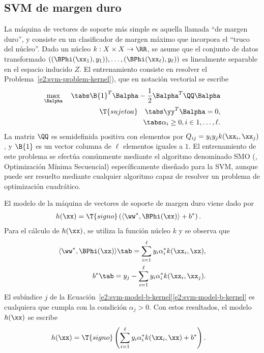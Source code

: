 %
%
\subsection{SVM de margen duro}
%
La máquina de vectores de soporte más simple es aquella llamada ``de
margen duro'', y consiste en un clasificador de margen máximo que
incorpora el ``truco del núcleo''.
Dado un núcleo $k:X\times{}X\rightarrow\RR$, se asume que el conjunto
de datos transformado
$\left((\BPhi(\xx_1),y_1)),\ldots,(\BPhi(\xx_\ell),y_\ell)\right)$ es
linealmente separable en el espacio inducido $Z$.
El entrenamiento consiste en resolver el
Problema~\ref{e2:svm-problem-kernel}), que en notación vectorial se
escribe
%
\begin{equation}\label{e2:svm-hard-margin}
  \begin{aligned}
    \max_{\Balpha}\quad\tabs
      \B{1}^T\Balpha-\frac{1}{2}\Balpha^T\QQ\Balpha\\
    \T{sujeto a} \quad\tabs
      \yy^T\Balpha = 0, \\
      \tabs \alpha_i\geq 0,  i\in {1,\ldots,\ell }.
  \end{aligned}
\end{equation}
%
La matriz $\QQ$ es semidefinida positiva con elementos por
$Q_{ij}=y_iy_jk(\xx_i,\xx_j)$, y $\B{1}$ es un vector columna de
$\ell$ elementos iguales a $1$.
El entrenamiento de este problema se efectúa comúnmente mediante el
algoritmo denominado SMO (,
Optimización Mínima Secuencial) \cite{smo} específicamente diseñado
para la SVM, aunque puede ser resuelto mediante cualquier algoritmo
capaz de resolver un problema de optimización cuadrático.

El modelo de la máquina de vectores de soporte de margen
duro viene dado por
%
\begin{align}\label{e2:svm-model-hard0}
    h(\xx) &= \T{signo}\left(\langle\ww^*,\BPhi(\xx)\rangle+b^*\right).
\end{align}
%
Para el cálculo de $h(\xx)$, se utiliza la función núcleo $k$ y se
observa que
%
\begin{align}
  \langle\ww^*,\BPhi(\xx)\rangle \tab=
  \sum_{i=1}^\ell{}y_i\alpha^*_ik(\xx_i,\xx),\\
  b^* \tab= y_j - \sum_{i=1}^\ell{}y_i\alpha^*_ik(\xx_i,\xx_j).
  \label{e2:svm-model-b-kernel}
\end{align}
%
El subíndice $j$ de la
\iflatexml{}Ecuación~\ref{e2:svm-model-b-kernel}\else\autoref{e2:svm-model-b-kernel}\fi{}
es cualquiera que cumpla con la condición $\alpha_j>0$.
Con estos resultados, el modelo $h(\xx)$ se escribe
%
\begin{align}
  h(\xx) &=
  \T{signo}\left(\sum_{i=1}^\ell{}y_i\alpha^*_ik(\xx_i,\xx)+b^*\right).
\label{e2:svm-model-hard}
\end{align}
%
